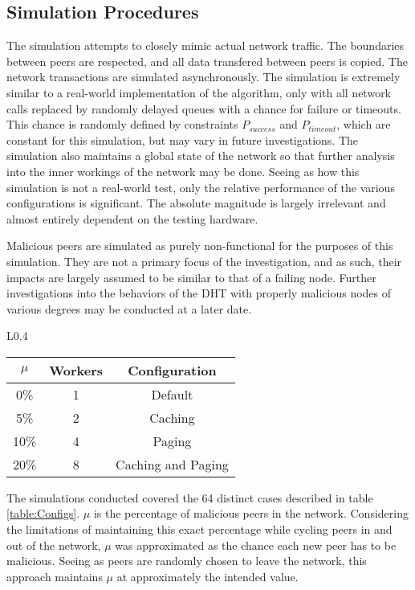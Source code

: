 \documentclass[12pt]{report}
\theoremstyle{plain}
\begin{document}
		
\subsection*{Simulation Procedures}
	The simulation attempts to closely mimic actual network traffic. 
	The boundaries between peers are respected, and all data transfered between peers is copied. 
	The network transactions are simulated asynchronously. 
	The simulation is extremely similar to a real-world implementation of the algorithm,
	only with all network calls replaced by randomly delayed queues with a chance for failure or timeouts. 
	This chance is randomly defined by constraints $P_{success}$ and $P_{timeout}$, which are constant for this simulation, 
	but may vary in future investigations. 
	The simulation also maintains a global state of the network so that further analysis into the inner workings of the network may be done. 
	Seeing as how this simulation is not a real-world test, only the relative performance of the various configurations is significant. 
	The absolute magnitude is largely irrelevant and almost entirely dependent on the testing hardware.

	Malicious peers are simulated as purely non-functional for the purposes of this simulation. 
	They are not a primary focus of the investigation, and as such, their impacts are largely assumed to be similar to that of a failing node. 
	Further investigations into the behaviors of the DHT with properly malicious nodes of various degrees may be conducted at a later date.

	\begin{wraptable}{L}{0.4\textwidth}
		\caption{Simulation configurations}
		\label{table:Configs}
		\centering
		\footnotesize
		\begin{tabular}{ | c | c | c |}
			\hline
			$\mu$ & Workers & Configuration \\ 
			\hline\hline
			0\% & 1 & Default \\
			\hline
			5\% & 2 & Caching \\
			\hline
			10\% & 4 & Paging \\
			\hline
			20\% & 8 & Caching and Paging \\
			\hline
		\end{tabular}
	\end{wraptable}

	The simulations conducted covered the 64 distinct cases described in table \ref{table:Configs}.
	$\mu$ is the percentage of malicious peers in the network. 
	Considering the limitations of maintaining this exact percentage while cycling peers in and out of the network, 
	$\mu$ was approximated as the chance each new peer has to be malicious. Seeing as peers are randomly chosen to leave the network, 
	this approach maintains $\mu$ at approximately the intended value.
\end{document}

